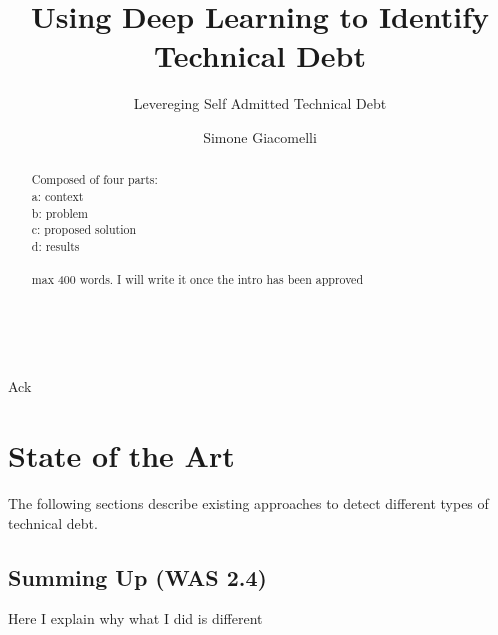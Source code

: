\documentclass[11pt, mscthesis]{usiinfthesis}
\title{Using Deep Learning to Identify Technical Debt} %
\subtitle{Levereging Self Admitted Technical Debt} %
\author{Simone Giacomelli} %
\begin{document}
\maketitle %

\frontmatter %

\begin{abstract}
Composed of four parts: \\
a: context\\
b: problem\\
c: proposed solution\\
d: results\\
\\
max 400 words.
I will write it once the intro has been approved
\\
\\
\\

\end{abstract}



\begin{acknowledgements}
Ack 
\end{acknowledgements}

\tableofcontents 
\listoffigures %
\listoftables %

\mainmatter




\chapter{State of the Art}
The following sections describe existing approaches to detect different types of technical debt.







\section{Summing Up (WAS 2.4)}
Here I explain why what I did is different


\end{document}

